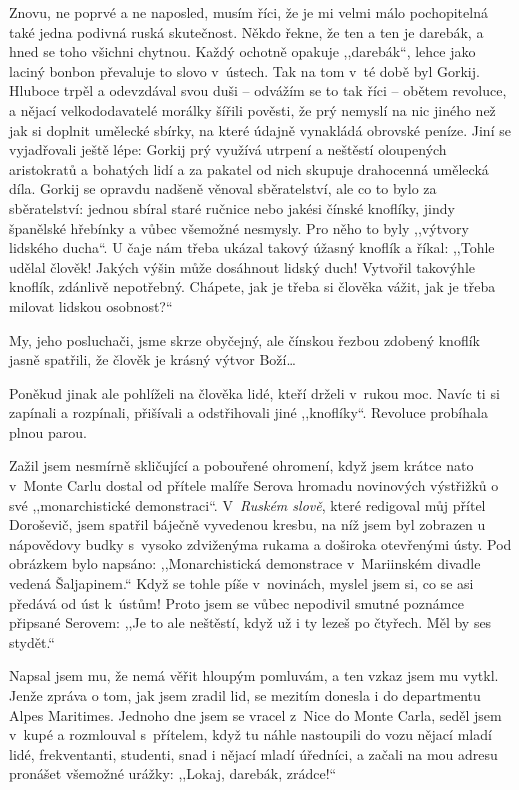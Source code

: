 Znovu, ne poprvé a ne naposled, musím říci, že je mi velmi málo pochopitelná také jedna podivná ruská skutečnost. Někdo řekne, že ten a ten je darebák, a hned se toho všichni chytnou. Kaž\-dý ochotně opakuje ,,darebák``, lehce jako laciný bonbon převaluje to slovo v ústech. Tak na tom v té době byl Gorkij. Hluboce trpěl a odevzdával svou duši -- odvážím se to tak říci -- obětem revoluce, a nějací velkododavatelé morálky šířili pověsti, že prý nemyslí na nic jiného než jak si doplnit umělecké sbírky, na které údajně vynakládá obrovské peníze. Jiní se vyjadřovali ještě lépe: Gorkij prý využívá utrpení a neštěstí oloupených aristokratů a bohatých lidí a za pakatel od nich skupuje drahocenná umělecká díla. Gorkij se opravdu nadšeně věnoval sběratelství, ale co to bylo za sběratelství: jednou sbíral staré ručnice nebo jakési čínské knoflíky, jindy španělské hřebínky a vůbec všemožné nesmysly. Pro něho to byly ,,výtvory lidského ducha``. U čaje nám třeba ukázal takový úžasný knoflík a říkal: ,,Tohle udělal člověk! Jakých výšin může dosáhnout lidský duch! Vytvořil takovýhle knoflík, zdánlivě nepotřebný. Chápete, jak je třeba si člověka vážit, jak je třeba milovat lidskou osobnost?``

My, jeho posluchači, jsme skrze obyčejný, ale čínskou řezbou zdobený knoflík jasně spatřili, že člověk je krásný výtvor Boží\ldots

Poněkud jinak ale pohlíželi na člověka lidé, kteří drželi v rukou moc. Navíc ti si zapínali a rozpínali, přišívali a odstřihovali jiné ,,knoflíky``. 
Revoluce probíhala plnou parou. 

\medskip

\noindent
Zažil jsem nesmírně skličující a pobouřené ohromení, když jsem krátce nato v Monte Carlu dostal od přítele malíře Serova hromadu novinových výstřižků o své ,,monarchistické demonstraci``. V \textit{Ruském slově}, které redigoval můj přítel Doroševič, jsem spatřil báječně vyvedenou kresbu, na níž jsem byl zobrazen u nápovědovy budky s vysoko zdviženýma rukama a doširoka otevřenými ústy. Pod obrázkem bylo napsáno: ,,Monarchistická demonstrace v Mariinském divadle vedená Šaljapinem.`` Když se tohle píše v novinách, myslel jsem si, co se asi předává od úst k ústům! Proto jsem se vůbec nepodivil smutné poznámce připsané Serovem: ,,Je to ale neštěstí, když už i ty lezeš po čtyřech. Měl by ses stydět.``

Napsal jsem mu, že nemá věřit hloupým pomluvám, a ten vzkaz jsem mu vytkl. Jenže zpráva o tom, jak jsem zradil lid, se mezitím donesla i do departmentu Alpes Maritimes. Jednoho dne jsem se vracel z Nice do Monte Carla, seděl jsem v kupé a rozmlouval s přítelem, když tu náhle nastoupili do vozu nějací mladí lidé, frekventanti, studenti, snad i nějací mladí úředníci, a začali na mou adresu pronášet všemožné urážky:
 ,,Lokaj, darebák, zrádce!``

